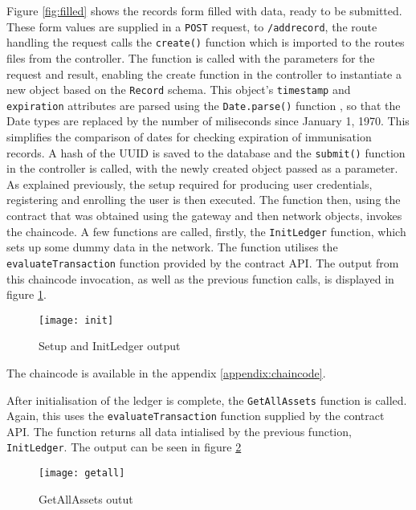 Figure \ref{fig:filled} shows the records form filled with data, ready to be submitted. 
These form values are supplied in a \lstinline{POST} request, to \lstinline{/addrecord}, the route handling the request calls the \lstinline{create()} function which is imported to the routes files from the controller.
The function is called with the parameters for the request and result, enabling the create function in the controller to instantiate a new object based on the \lstinline{Record} schema.
This object's \lstinline{timestamp} and \lstinline{expiration} attributes are parsed using the \lstinline{Date.parse()} function \cite{noauthor_dateparse_nodate}, so that the Date types are replaced by the number of miliseconds since January 1, 1970. 
This simplifies the comparison of dates for checking expiration of immunisation records.
A hash of the UUID is saved to the database and the \lstinline{submit()} function in the controller is called, with the newly created object passed as a parameter. 
As explained previously, the setup required for producing user credentials, registering and enrolling the user is then executed. 
The function then, using the contract that was obtained using the gateway and then network objects, invokes the chaincode. 
A few functions are called, firstly, the \lstinline{InitLedger} function, which sets up some dummy data in the network. 
The function utilises the \lstinline{evaluateTransaction} function provided by the contract API.
The output from this chaincode invocation, as well as the previous function calls, is displayed in figure \ref{fig:init}.

\begin{figure}[H]
  \texttt{[image: init]}
  \caption{Setup and InitLedger output}
  \label{fig:init}
\end{figure}

The chaincode is available in the appendix \ref{appendix:chaincode}. 

After initialisation of the ledger is complete, the \lstinline{GetAllAssets} function is called.
Again, this uses the \lstinline{evaluateTransaction} function supplied by the contract API.  
The function returns all data intialised by the previous function, \lstinline{InitLedger}.
The output can be seen in figure \ref{fig:getall}

\begin{figure}[H]
  \texttt{[image: getall]}
  \caption{GetAllAssets outut}
  \label{fig:getall}
\end{figure}

